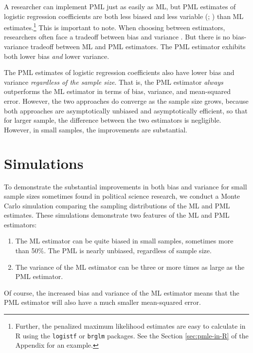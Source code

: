 \documentclass[12pt]{article}
\begin{document}
A researcher can implement PML just as easily as ML, but PML estimates of logistic regression coefficients are both less biased \citep{Firth1993} and less variable (\citealt[p. 49]{Kosmidis2007}; \citealt{Copas1988}) than ML estimates.\footnote{Further, the penalized maximum likelihood estimates are easy to calculate in R using the \texttt{logistf} or \texttt{brglm} packages. 
See the Section \ref{sec:pmle-in-R} of the Appendix for an example.}
This is important to note. 
When choosing between estimators, researchers often face a tradeoff between bias and variance \citep[pp. 37-38]{HastieTibshiraniFriedman2013}.
But there is no bias-variance tradeoff between ML and PML estimators.
The PML estimator exhibits both lower bias \textit{and} lower variance.

The PML estimates of logistic regression coefficients also have lower bias and variance \textit{regardless of the sample size}. That is, the PML estimator \textit{always} outperforms the ML estimator in terms of bias, variance, and mean-squared error. 
However, the two approaches do converge as the sample size grows, because both approaches are asymptotically unbiased and asymptotically efficient, so that for larger sample, the difference between the two estimators is negligible. However, in small samples, the improvements are substantial.

\section*{Simulations}

To demonstrate the substantial improvements in both bias and variance for small sample sizes sometimes found in political science research, we conduct a Monte Carlo simulation comparing the sampling distributions of the ML and PML estimates.
These simulations demonstrate two features of the ML and PML estimators:
\begin{enumerate}
\item The ML estimator can be quite biased in small samples, sometimes more than 50\%. The PML is nearly unbiased, regardless of sample size.
\item The variance of the ML estimator can be three or more times as large as the PML estimator.
\end{enumerate}
Of course, the increased bias and variance of the ML estimator means that the PML estimator will also have a much smaller mean-squared error.
\end{document}
